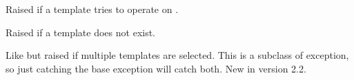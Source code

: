 \documentclass[a4paper,10pt,english]{sphinxmanual}
\begin{document}

\begin{fulllineitems}
\label{api:jinja2.UndefinedError}
Raised if a template tries to operate on {\hyperref[api:jinja2.Undefined]{}}.

\end{fulllineitems}


\begin{fulllineitems}
\label{api:jinja2.TemplateNotFound}
Raised if a template does not exist.

\end{fulllineitems}


\begin{fulllineitems}
\label{api:jinja2.TemplatesNotFound}
Like {\hyperref[api:jinja2.TemplateNotFound]{}} but raised if multiple templates
are selected.  This is a subclass of {\hyperref[api:jinja2.TemplateNotFound]{}}
exception, so just catching the base exception will catch both.
New in version 2.2.
\end{fulllineitems}

\end{document}
